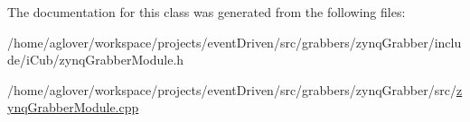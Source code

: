 The documentation for this class was generated from the following files\-:\begin{DoxyCompactItemize}
\item 
/home/aglover/workspace/projects/event\-Driven/src/grabbers/zynq\-Grabber/include/i\-Cub/zynq\-Grabber\-Module.\-h\item 
/home/aglover/workspace/projects/event\-Driven/src/grabbers/zynq\-Grabber/src/\hyperlink{zynqGrabberModule_8cpp}{zynq\-Grabber\-Module.\-cpp}\end{DoxyCompactItemize}
